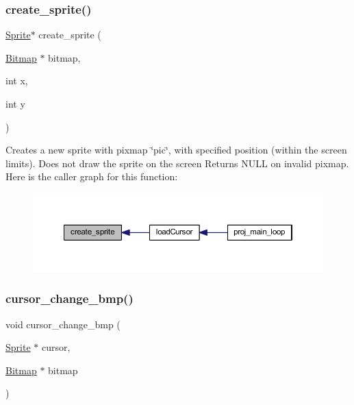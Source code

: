 \subsubsection{\texorpdfstring{create\+\_\+sprite()}{create\_sprite()}}
{\footnotesize\ttfamily \mbox{\hyperlink{struct_sprite}{Sprite}}$\ast$ create\+\_\+sprite (\begin{DoxyParamCaption}\item[{\mbox{\hyperlink{struct_bitmap}{Bitmap}} $\ast$}]{bitmap,  }\item[{int}]{x,  }\item[{int}]{y }\end{DoxyParamCaption})}

Creates a new sprite with pixmap \char`\"{}pic\char`\"{}, with specified position (within the screen limits). Does not draw the sprite on the screen Returns N\+U\+LL on invalid pixmap. Here is the caller graph for this function\+:\nopagebreak
\begin{figure}[H]
\begin{center}
\leavevmode
\includegraphics[width=350pt]{group__sprite_ga419fef722f3afd383e6d4171ffb54fb1_icgraph}
\end{center}
\end{figure}
\mbox{\label{group__sprite_gad12aa07248bed260a545f3ee69372842}} 
\subsubsection{\texorpdfstring{cursor\+\_\+change\+\_\+bmp()}{cursor\_change\_bmp()}}
{\footnotesize\ttfamily void cursor\+\_\+change\+\_\+bmp (\begin{DoxyParamCaption}\item[{\mbox{\hyperlink{struct_sprite}{Sprite}} $\ast$}]{cursor,  }\item[{\mbox{\hyperlink{struct_bitmap}{Bitmap}} $\ast$}]{bitmap }\end{DoxyParamCaption})}



